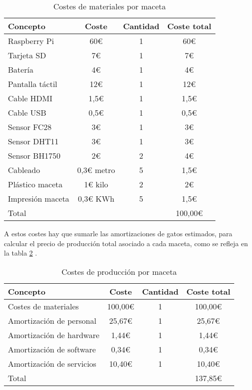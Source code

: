             \begin{table}[H]
                \centering
                \caption{Costes de materiales por maceta}
                \begin{tabular}{|l|c|c|c|}
                    \hline
                    Concepto & Coste & Cantidad & Coste total \\
                    \hline
                    Raspberry Pi & 60€ & 1 & 60€ \\
                    Tarjeta SD & 7€ & 1 & 7€ \\
                    Batería & 4€ & 1 & 4€ \\
                    Pantalla táctil & 12€ & 1 & 12€ \\
                    Cable HDMI & 1,5€ & 1 & 1,5€ \\
                    Cable USB & 0,5€ & 1 & 0,5€ \\
                    Sensor FC28 & 3€ & 1 & 3€ \\
                    Sensor DHT11 & 3€ & 1 & 3€ \\
                    Sensor BH1750 & 2€ & 2 & 4€ \\
                    Cableado & 0,3€ metro & 5 & 1,5€ \\
                    Plástico maceta & 1€ kilo & 2 & 2€ \\
                    Impresión maceta & 0,3€ KWh & 5 & 1,5€ \\
                    \hline
                    Total & & & 100,00€ \\
                    \hline
                \end{tabular}
                \label{tab:costes de materiales por maceta de plan de negocio}
            \end{table}
            A estos costes hay que sumarle las amortizaciones de gatos estimados, para calcular el precio de producción total asociado a cada maceta, como se refleja en la tabla \ref{tab:costes de producción por maceta de plan de negocio} .
            \begin{table}[H]
                \centering
                \caption{Costes de producción por maceta}
                \begin{tabular}{|l|c|c|c|}
                    \hline
                    Concepto & Coste & Cantidad & Coste total \\
                    \hline
                    Costes de materiales & 100,00€ & 1 & 100,00€ \\
                    Amortización de personal & 25,67€ & 1 & 25,67€ \\
                    Amortización de hardware & 1,44€ & 1 & 1,44€ \\
                    Amortización de software & 0,34€ & 1 & 0,34€ \\
                    Amortización de servicios & 10,40€ & 1 & 10,40€ \\
                    \hline
                    Total & & & 137,85€ \\
                    \hline
                \end{tabular}
                \label{tab:costes de producción por maceta de plan de negocio}
            \end{table}

